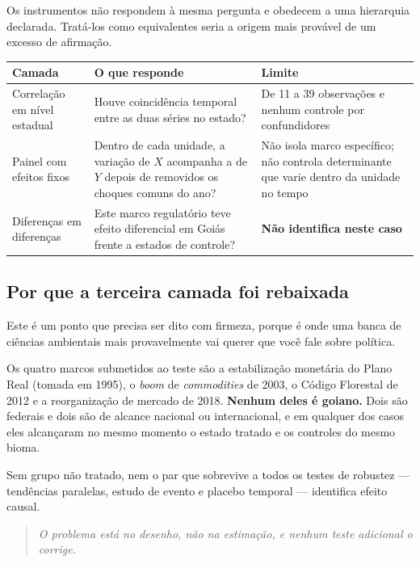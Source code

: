 Os instrumentos não respondem à mesma pergunta e obedecem a uma hierarquia
declarada. Tratá-los como equivalentes seria a origem mais provável de um
excesso de afirmação.

\vspace{6pt}
\begin{tabular}{@{}p{2.9cm}p{5.2cm}p{6.4cm}@{}}
\toprule
\textbf{Camada} & \textbf{O que responde} & \textbf{Limite} \\
\midrule
Correlação em nível estadual & Houve coincidência temporal entre as duas séries no estado? & De 11 a 39 observações e nenhum controle por confundidores \\
\addlinespace
Painel com efeitos fixos & Dentro de cada unidade, a variação de $X$ acompanha a de $Y$ depois de removidos os choques comuns do ano? & Não isola marco específico; não controla determinante que varie dentro da unidade no tempo \\
\addlinespace
Diferenças em diferenças & Este marco regulatório teve efeito diferencial em Goiás frente a estados de controle? & \textbf{Não identifica neste caso} \\
\bottomrule
\end{tabular}

\vspace{10pt}
\subsection{Por que a terceira camada foi rebaixada}

Este é um ponto que precisa ser dito com firmeza, porque é onde uma banca de
ciências ambientais mais provavelmente vai querer que você fale sobre política.

Os quatro marcos submetidos ao teste são a estabilização monetária do Plano
Real (tomada em 1995), o \emph{boom} de \emph{commodities} de 2003, o Código
Florestal de 2012 e a reorganização de mercado de 2018. \textbf{Nenhum deles é
goiano.} Dois são federais e dois são de alcance nacional ou internacional, e em
qualquer dos casos eles alcançaram no mesmo momento o estado tratado e os
controles do mesmo bioma.

Sem grupo não tratado, nem o par que sobrevive a todos os testes de robustez
--- tendências paralelas, estudo de evento e placebo temporal --- identifica
efeito causal.

\begin{quote}\itshape\color{cortinta}
O problema está no \emph{desenho}, não na estimação, e nenhum teste adicional o
corrige.
\end{quote}

